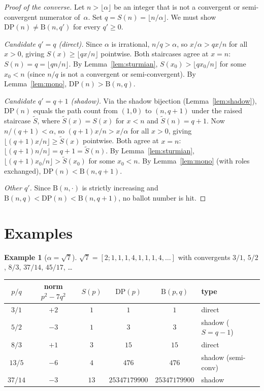 \documentclass[11pt]{article}
\theoremstyle{definition}
\newtheorem{example}[theorem]{Example}
\theoremstyle{remark}
\newcommand{\floor}[1]{\lfloor #1 \rfloor}
\newcommand{\B}{\mathrm{B}}
\begin{document}
\begin{proof}[Proof of the converse]
Let $n > \floor{\alpha}$ be an integer that is not a convergent or semi-convergent numerator of~$\alpha$.
Set $q = S(n) = \floor{n/\alpha}$.
We must show $\mathrm{DP}(n) \neq \B(n, q')$ for every $q' \geq 0$.

\emph{Candidate $q' = q$ (direct).}
Since $\alpha$ is irrational, $n/q > \alpha$, so $x/\alpha > qx/n$ for all $x > 0$, giving $S(x) \geq \floor{qx/n}$ pointwise.
Both staircases agree at $x = n$: $S(n) = q = \floor{qn/n}$.
By Lemma~\ref{lem:sturmian}, $S(x_0) > \floor{qx_0/n}$ for some $x_0 < n$ (since $n/q$ is not a convergent or semi-convergent).
By Lemma~\ref{lem:mono}, $\mathrm{DP}(n) > \B(n, q)$.

\emph{Candidate $q' = q + 1$ (shadow).}
Via the shadow bijection (Lemma~\ref{lem:shadow}), $\mathrm{DP}(n)$ equals the path count from $(1,0)$ to $(n, q+1)$ under the raised staircase $\tilde{S}$, where $\tilde{S}(x) = S(x)$ for $x < n$ and $\tilde{S}(n) = q + 1$.
Now $n/(q+1) < \alpha$, so $(q{+}1)x/n > x/\alpha$ for all $x > 0$, giving $\floor{(q{+}1)x/n} \geq \tilde{S}(x)$ pointwise.
Both agree at $x = n$: $\floor{(q{+}1)n/n} = q + 1 = \tilde{S}(n)$.
By Lemma~\ref{lem:sturmian}, $\floor{(q{+}1)x_0/n} > \tilde{S}(x_0)$ for some $x_0 < n$.
By Lemma~\ref{lem:mono} (with roles exchanged), $\mathrm{DP}(n) < \B(n, q+1)$.

\emph{Other $q'$.}
Since $\B(n, \cdot)$ is strictly increasing and $\B(n, q) < \mathrm{DP}(n) < \B(n, q+1)$, no ballot number is hit.
\end{proof}

\section{Examples}

\begin{example}[$\alpha = \sqrt{7}$]
$\sqrt{7} = [2; 1, 1, 1, 4, 1, 1, 1, 4, \ldots]$ with convergents $3/1$, $5/2$, $8/3$, $37/14$, $45/17$, \ldots

\medskip
\begin{tabular}{cccccl}
\toprule
$p/q$ & norm $p^2 - 7q^2$ & $S(p)$ & $\mathrm{DP}(p)$ & $\B(p,q)$ & type \\
\midrule
$3/1$ & $+2$ & $1$ & $1$ & $1$ & direct \\
$5/2$ & $-3$ & $1$ & $3$ & $3$ & shadow ($S = q-1$) \\
$8/3$ & $+1$ & $3$ & $15$ & $15$ & direct \\
$13/5$ & $-6$ & $4$ & $476$ & $476$ & shadow (semi-conv) \\
$37/14$ & $-3$ & $13$ & $25347179900$ & $25347179900$ & shadow \\
\bottomrule
\end{tabular}
\end{example}
\end{document}
